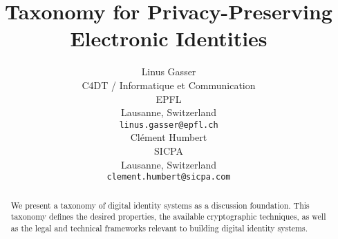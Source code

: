 \documentclass{article}
\title{Taxonomy for Privacy-Preserving Electronic Identities}
\author{
 Linus Gasser \\
  C4DT / Informatique et Communication \\
  EPFL \\
  Lausanne, Switzerland \\
  \texttt{linus.gasser@epfl.ch} \\
  \AND
 Cl\'ement Humbert \\
  SICPA \\
  Lausanne, Switzerland \\
  \texttt{clement.humbert@sicpa.com} \\
}
\begin{document}
\newcommand{\eid}{e-ID\xspace}
\newcommand{\rot}{Trust and Threats\xspace}
\newcommand{\sfi}{Solution Foundation and Implementation\xspace}
\newcommand{\rnf}{Regulatory and Normative Frameworks\xspace}
\newcommand{\swiyu}{Swiyu\xspace}

\maketitle
\begin{abstract}
We present a taxonomy of digital identity systems as a discussion foundation.
This taxonomy defines the desired properties, the available
cryptographic techniques, as well as the legal and technical
frameworks relevant to building digital identity systems.
\end{abstract}
















  

\end{document}
